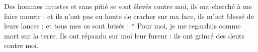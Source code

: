 Des hommes injustes et sans pitié se sont élevés contre moi, ils ont cherché à me faire mourir : et ils n’ont pas eu honte de cracher sur ma face, ils m’ont blessé de leurs lances : et tous mes os sont brisés :
\versseparator
* Pour moi, je me regardais comme mort sur la terre.
\versseparator
Ils ont répandu sur moi leur fureur : ils ont grincé des dents contre moi.
